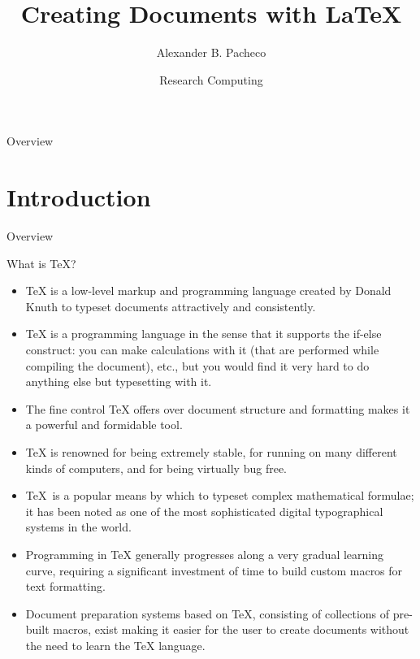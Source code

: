 \documentclass[style=lehigh,orient=landscape]{powerdot}
\title{Creating Documents with \LaTeX{}}
\author{Alexander B. Pacheco}
\date{Research Computing}
\begin{document}
\maketitle
\begin{wideslide}[toc=,bm=]{Overview}
  \tableofcontents[content=sections]
\end{wideslide}
\scriptsize

\section[slide=false]{Introduction}
\begin{wideslide}[toc=,bm=]{Overview}
  \tableofcontents[content=currentsection,type=0]
\end{wideslide}
\begin{wideslide}[bm={What is \TeX{} \& \LaTeX?}]{What is \TeX{}?}
  \begin{itemize}
  \item \TeX{} is a low-level markup and programming language created by Donald Knuth to typeset documents attractively and consistently.
  \item \TeX{} is a programming language in the sense that it supports the if-else construct: you can make calculations with it (that are performed while compiling the document), etc., but you would find it very hard to do anything else but typesetting with it.
  \item The fine control \TeX{} offers over document structure and formatting makes it a powerful and formidable tool.
  \item \TeX{} is renowned for being extremely stable, for running on many different kinds of computers, and for being virtually bug free.
  \item \TeX\, is a popular means by which to typeset complex mathematical formulae; it has been noted as one of the most sophisticated digital typographical systems in the world.
  \item Programming in \TeX{} generally progresses along a very gradual learning curve, requiring a significant investment of time to build custom macros for text formatting.
  \item Document preparation systems based on \TeX{}, consisting of collections of pre-built macros, exist making it easier for the user to create documents without the need to learn the \TeX{} language.
  \end{itemize}
\end{wideslide}	
\end{document}
